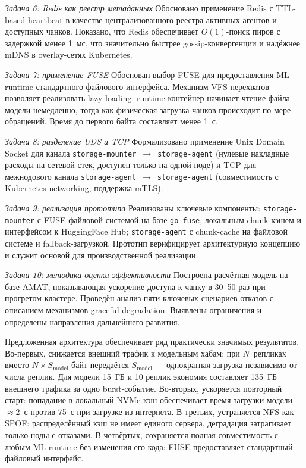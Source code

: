 \textit{Задача 6: Redis как реестр метаданных} Обосновано применение Redis с TTL-based heartbeat в качестве централизованного реестра активных агентов и доступных чанков. Показано, что Redis обеспечивает $O(1)$-поиск пиров с задержкой менее 1~мс, что значительно быстрее gossip-конвергенции и надёжнее mDNS в overlay-сетях Kubernetes.

\textit{Задача 7: применение FUSE} Обоснован выбор FUSE для предоставления ML-runtime стандартного файлового интерфейса. Механизм VFS-перехватов позволяет реализовать lazy loading: runtime-контейнер начинает чтение файла модели немедленно, тогда как физическая загрузка чанков происходит по мере обращений. Время до первого байта составляет менее 1~с.

\textit{Задача 8: разделение UDS и TCP} Формализовано применение Unix Domain Socket для канала \texttt{storage-mounter}~$\to$~\texttt{storage-agent} (нулевые накладные расходы на сетевой стек, доступен только на одной ноде) и TCP для межнодового канала \texttt{storage-agent}~$\to$~\texttt{storage-agent} (совместимость с Kubernetes networking, поддержка mTLS).

\textit{Задача 9: реализация прототипа} Реализованы ключевые компоненты: \texttt{storage-mounter} с FUSE-файловой системой на базе \texttt{go-fuse}, локальным chunk-кэшем и интерфейсом к HuggingFace Hub; \texttt{storage-agent} с chunk-cache на файловой системе и fallback-загрузкой. Прототип верифицирует архитектурную концепцию и служит основой для производственной реализации.

\textit{Задача 10: методика оценки эффективности} Построена расчётная модель на базе AMAT, показывающая ускорение доступа к чанку в 30--50 раз при прогретом кластере. Проведён анализ пяти ключевых сценариев отказов с описанием механизмов graceful degradation. Выявлены ограничения и определены направления дальнейшего развития.

 Предложенная архитектура обеспечивает ряд практически значимых результатов. Во-первых, снижается внешний трафик к модельным хабам: при $N$~репликах вместо $N \times S_{\mathrm{model}}$ байт передаётся $S_{\mathrm{model}}$ --- однократная загрузка независимо от числа реплик. Для модели 15~ГБ и 10 реплик экономия составляет 135~ГБ внешнего трафика за одно burst-событие. Во-вторых, ускоряется повторный старт: попадание в локальный NVMe-кэш обеспечивает время загрузки модели $\approx$2~с против 75~с при загрузке из интернета. В-третьих, устраняется NFS как SPOF: распределённый кэш не имеет единого сервера, деградация затрагивает только ноды с отказами. В-четвёртых, сохраняется полная совместимость с любым ML-runtime без изменения его кода: FUSE предоставляет стандартный файловый интерфейс.

